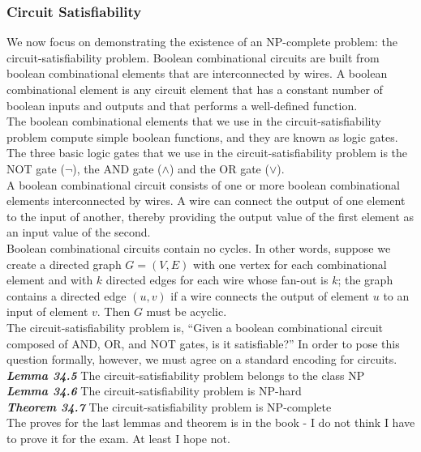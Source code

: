 \subsubsection{Circuit Satisfiability}
We now focus on demonstrating the existence of an NP-complete problem: the circuit-satisfiability problem. Boolean combinational circuits are built from boolean combinational elements that are interconnected by wires. A boolean combinational element is any circuit element that has a constant number of boolean inputs and outputs and that performs a well-defined function.\\

The boolean combinational elements that we use in the circuit-satisfiability problem compute simple boolean functions, and they are known as logic gates. The three basic logic gates that we use in the circuit-satisfiability problem is the NOT gate ($\neg$), the AND gate ($\wedge$) and the OR gate ($\vee$). \\

A boolean combinational circuit consists of one or more boolean combinational elements interconnected by wires. A wire can connect the output of one element to the input of another, thereby providing the output value of the first element as an input value of the second.\\

Boolean combinational circuits contain no cycles. In other words, suppose we create a directed graph $G = (V, E)$ with one vertex for each combinational element and with $k$ directed edges for each wire whose fan-out is $k$; the graph contains a directed edge $(u, v)$ if a wire connects the output of element $u$ to an input of element $v$. Then $G$ must be acyclic.\\

The circuit-satisfiability problem is, ``Given a boolean combinational circuit composed of AND, OR, and NOT gates, is it satisfiable?'' In order to pose this question formally, however, we must agree on a standard encoding for circuits.\\

\textbf{\textit{Lemma 34.5}} The circuit-satisfiability problem belongs to the class NP\\
\textbf{\textit{Lemma 34.6}} The circuit-satisfiability problem is NP-hard\\
\textbf{\textit{Theorem 34.7}} The circuit-satisfiability problem is NP-complete \\

 The proves for the last lemmas and theorem is in the book - I do not think I have to prove it for the exam. At least I hope not. 

